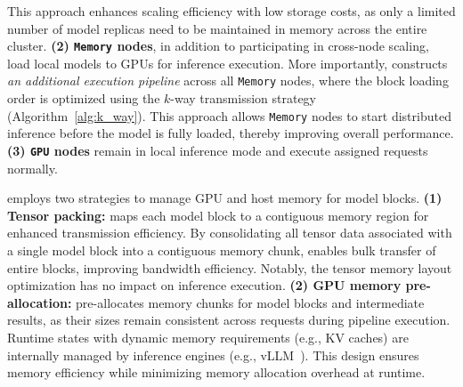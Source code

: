This approach enhances scaling efficiency with low storage costs, as only a limited number of model replicas need to be maintained in memory across the entire cluster.
\textbf{(2) \texttt{Memory} nodes}, in addition to participating in cross-node scaling, load local models to GPUs for inference execution. 
More importantly, \SysName constructs \emph{an additional execution pipeline} across all \texttt{Memory} nodes, where the block loading order is optimized using the $k$-way transmission strategy (Algorithm~\ref{alg:k_way}). 
This approach allows \texttt{Memory} nodes to start distributed inference before the model is fully loaded, thereby improving overall performance.
\textbf{(3) \texttt{GPU} nodes} remain in local inference mode and execute assigned requests normally. 
\fi 

\SysName employs two strategies to manage GPU and host memory for model blocks. 
\textbf{(1) Tensor packing:} \SysName maps each model block to a contiguous memory region for enhanced transmission efficiency. 
By consolidating all tensor data associated with a single model block into a contiguous memory chunk, \SysName enables bulk transfer of entire blocks, improving bandwidth efficiency.
Notably, the tensor memory layout optimization has no impact on inference execution. 
\textbf{(2) GPU memory pre-allocation:} \SysName pre-allocates memory chunks for model blocks and intermediate results, as their sizes remain consistent across requests during pipeline execution. 
Runtime states with dynamic memory requirements (e.g., KV caches) are internally managed by inference engines (e.g., vLLM~\cite{kwon2023efficient}). 
This design ensures memory efficiency while minimizing memory allocation overhead at runtime. 

